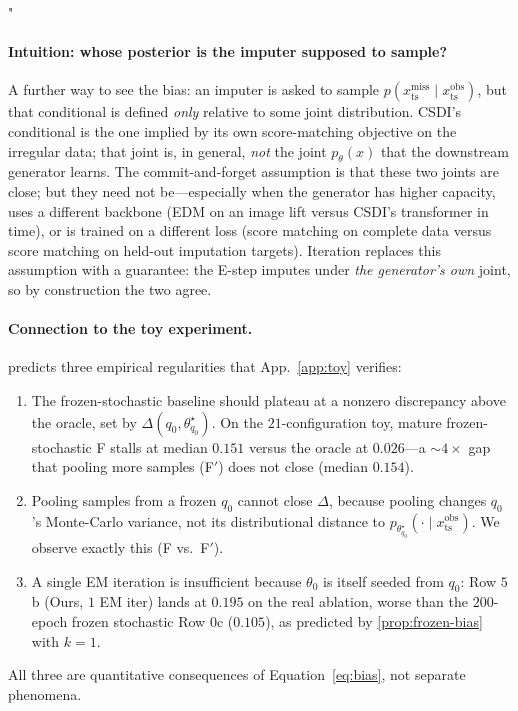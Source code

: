 "\documentclass{article}
\theoremstyle{plain}
\theoremstyle{definition}
\theoremstyle{remark}
\newcommand{\xts}{x_{\mathrm{ts}}}
\begin{document}
\paragraph{Intuition: whose posterior is the imputer supposed to sample?}
A further way to see the bias: an imputer is asked to sample $p(\xts^{\mathrm{miss}}\mid\xts^{\mathrm{obs}})$, but that conditional is defined \emph{only} relative to some joint distribution. CSDI's conditional is the one implied by its own score-matching objective on the irregular data; that joint is, in general, \emph{not} the joint $p_\theta(x)$ that the downstream generator learns. The commit-and-forget assumption is that these two joints are close; but they need not be---especially when the generator has higher capacity, uses a different backbone (EDM on an image lift versus CSDI's transformer in time), or is trained on a different loss (score matching on complete data versus score matching on held-out imputation targets). Iteration replaces this assumption with a guarantee: the E-step imputes under \emph{the generator's own} joint, so by construction the two agree.

\paragraph{Connection to the toy experiment.}
 predicts three empirical regularities that App.~\ref{app:toy} verifies:
\begin{enumerate}
\setlength{\itemsep}{0pt}
\item The frozen-stochastic baseline should plateau at a nonzero discrepancy above the oracle, set by $\Delta(q_0, \theta^\star_{q_0})$. On the $21$-configuration toy, mature frozen-stochastic F stalls at median $0.151$ versus the oracle at $0.026$---a $\sim 4\times$ gap that pooling more samples (F$'$) does not close (median $0.154$).
\item Pooling samples from a frozen $q_0$ cannot close $\Delta$, because pooling changes $q_0$'s Monte-Carlo variance, not its distributional distance to $p_{\theta^\star_{q_0}}(\cdot\mid\xts^{\mathrm{obs}})$. We observe exactly this (F vs.\ F$'$).
\item A single EM iteration is insufficient because $\theta_0$ is itself seeded from $q_0$: Row $5$b (Ours, $1$ EM iter) lands at $0.195$ on the real ablation, worse than the $200$-epoch frozen stochastic Row $0$c ($0.105$), as predicted by \cref{prop:frozen-bias} with $k = 1$.
\end{enumerate}
All three are quantitative consequences of Equation~\eqref{eq:bias}, not separate phenomena.
\end{document}
